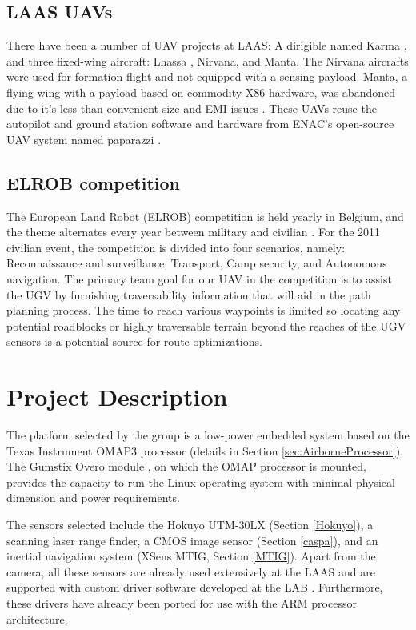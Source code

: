 \documentclass[a4paper,11pt]{report}
\begin{document}
\vspace{1cm}

\section{LAAS UAVs}

There have been a number of UAV projects at LAAS: A dirigible named Karma \cite{karma}, and three fixed-wing aircraft: Lhassa \cite{lhassa}, Nirvana, and Manta. The Nirvana aircrafts were used for formation flight \cite{gautier} and not equipped with a sensing payload. Manta, a flying wing with a payload based on commodity X86 hardware, was abandoned due to it's less than convenient size and EMI issues \cite{manta}. These UAVs reuse the autopilot and ground station software and hardware from ENAC's open-source UAV system named paparazzi \cite{paparazzi}.

\section{ELROB competition}

The European Land Robot (ELROB) competition is held yearly in Belgium, and the theme alternates every year between military and civilian \cite{elrob}. For the 2011 civilian event, the competition is divided into four scenarios, namely: Reconnaissance and surveillance, Transport, Camp security, and Autonomous navigation. The primary team goal for our UAV in the competition is to assist the UGV by furnishing traversability information that will aid in the path planning process. The time to reach various waypoints is limited so locating any potential roadblocks or highly traversable terrain beyond the reaches of the UGV sensors is a potential source for route optimizations.

\chapter{Project Description}

The platform selected by the group is a low-power embedded system based on the Texas Instrument OMAP3 processor (details in Section \ref{sec:AirborneProcessor}). The Gumstix Overo module \cite{Overo}, on which the OMAP processor is mounted, provides the capacity to run the Linux operating system with minimal physical dimension and power requirements. 

The sensors selected include the Hokuyo UTM-30LX (Section \ref{Hokuyo}), a scanning laser range finder, a CMOS image sensor (Section \ref{caspa}), and an inertial navigation system (XSens MTIG, Section \ref{MTIG}). Apart from the camera, all these sensors are already used extensively at the LAAS and are supported with custom driver software developed at the LAB \cite{robotpkg}. Furthermore, these drivers have already been ported for use with the ARM processor architecture.
\end{document}
